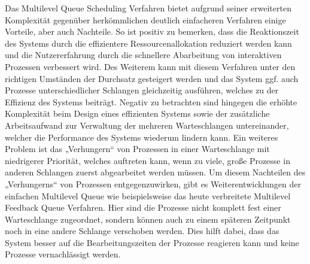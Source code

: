 Das Multilevel Queue Scheduling Verfahren bietet aufgrund seiner erweiterten Komplexität gegenüber herkömmlichen deutlich einfacheren Verfahren einige Vorteile, aber auch Nachteile. So ist positiv zu bemerken, dass die Reaktionszeit des Systems durch die effizientere Ressourcenallokation reduziert werden kann und die Nutzererfahrung durch die schnellere Abarbeitung von interaktiven Prozessen verbessert wird. Des Weiterem kann mit diesem Verfahren unter den richtigen Umständen der Durchsatz gesteigert werden und das System ggf. auch Prozesse unterschiedlicher Schlangen gleichzeitig ausführen, welches zu der Effizienz des Systems beiträgt. Negativ zu betrachten sind hingegen die erhöhte Komplexität beim Design eines effizienten Systems sowie der zusätzliche Arbeitsaufwand zur Verwaltung der mehreren Warteschlangen untereinander, welcher die Performance des Systems wiederum lindern kann. Ein weiteres Problem ist das „Verhungern“ von Prozessen in einer Warteschlange mit niedrigerer Priorität, welches auftreten kann, wenn zu viele, große Prozesse in anderen Schlangen zuerst abgearbeitet werden müssen.
Um diesem Nachteilen des „Verhungerns“ von Prozessen entgegenzuwirken, gibt es Weiterentwicklungen der einfachen Multilevel Queue wie beispielsweise das heute verbreitete Multilevel Feedback Queue Verfahren. Hier sind die Prozesse nicht komplett fest einer Warteschlange zugeordnet, sondern können auch zu einem späteren Zeitpunkt noch in eine andere Schlange verschoben werden. Dies hilft dabei, dass das System besser auf die Bearbeitungszeiten der Prozesse reagieren kann und keine Prozesse vernachlässigt werden.




